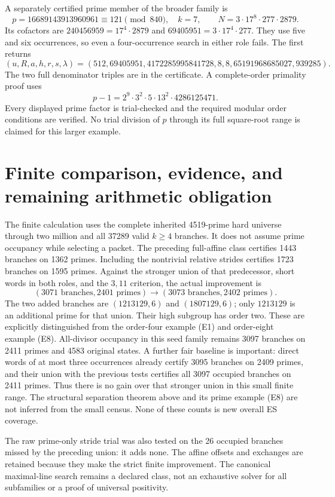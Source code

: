 A separately certified prime member of the broader family is
\[
 \boxed{p=16689143913960961\equiv121\pmod{840},\quad k=7,}\qquad
 N=3\cdot17^8\cdot277\cdot2879.                            \tag{E8}
\]
Its cofactors are $240456959=17^4\cdot2879$ and
$69405951=3\cdot17^4\cdot277$. They use five and six occurrences, so even a
four-occurrence search in either role fails. The first returns
\[
 (u,R,a,h,r,s,\lambda)
 =(512,69405951,4172285995841728,8,8,65191968685027,939285).
\]
The two full denominator triples are in the certificate. A complete-order
primality proof uses
\[
 p-1=2^9\cdot3^2\cdot5\cdot13^2\cdot4286125471.
\]
Every displayed prime factor is trial-checked and the required modular order
conditions are verified. No trial division of $p$ through its full square-root
range is claimed for this larger example.

\section{Finite comparison, evidence, and remaining arithmetic obligation}
The finite calculation uses the complete inherited 4519-prime hard universe
through two million and all 37289 valid $k\ge4$ branches. It does not assume
prime occupancy while selecting a packet. The preceding full-affine class
certifies 1443 branches on 1362 primes. Including the nontrivial relative
strides certifies 1723 branches on 1595 primes. Against the stronger union of
that predecessor, short words in both roles, and the $3,11$ criterion, the
actual improvement is
\[
 (3071\text{ branches},2401\text{ primes})
 \longrightarrow(3073\text{ branches},2402\text{ primes}).   \tag{F1}
\]
The two added branches are $(1213129,6)$ and $(1807129,6)$; only $1213129$ is an additional prime for that union. Their high subgroup
has order two. These are explicitly distinguished from the order-four example (E1) and order-eight example (E8). All-divisor occupancy in this seed family remains 3097
branches on 2411 primes and 4583 original states. A further fair baseline is
important: direct words of at most three occurrences already certify 3095
branches on 2409 primes, and their union with the previous tests certifies all
3097 occupied branches on 2411 primes. Thus there is no gain over that stronger
union in this small finite range. The structural separation theorem above and
its prime example (E8) are not inferred from the small census. None of these
counts is new overall ES coverage.

The raw prime-only stride trial was also tested on the 26 occupied branches
missed by the preceding union: it adds none. The affine offsets and exchanges
are retained because they make the strict finite improvement. The canonical
maximal-line search remains a declared class, not an exhaustive solver for
all subfamilies or a proof of universal positivity.

